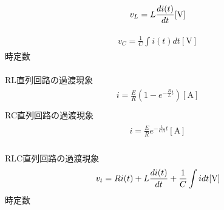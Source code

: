 \begin{align}
\begin{split}
v_{L}= L \dfrac{di(t)}{dt} \mathrm{[V]}
\end{split}
\end{align}

\begin{align}
\begin{split}
v_{C}= \frac{1}{C} \int i(t) dt \mathrm{[V]}
\end{split}
\end{align}
時定数\\


\ \\ 
RL直列回路の過渡現象
\begin{align}
\begin{split}
i=\frac{E}{R} (1-e^{-\frac{R}{L}t}) \mathrm{[A]}\\
\end{split}
\end{align}
RC直列回路の過渡現象
\begin{align}
\begin{split}
i=\frac{E}{R} e^{-\frac{1}{CR}t} \mathrm{[A]} \\
\end{split}
\end{align}

RLC直列回路の過渡現象
\begin{align}
\begin{split}
v_{t} = Ri(t) + L \dfrac{di(t)}{dt} + \frac{1}{C} \int i dt \mathrm{[V]}
\end{split}
\end{align}
時定数\\

